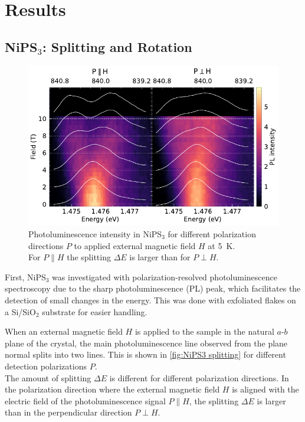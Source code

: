 \documentclass[
	twoside,
	parskip=half,
	a4paper,
]{scrbook}
\begin{document}
\chapter{Results}

\section{NiPS$_3$: Splitting and Rotation}
\begin{figure}
	\centering
	\includegraphics{../figures/2024-04-10 NiPS4 splitting.pdf}
	\caption{
		Photoluminescence intensity in NiPS$_3$ for different polarization directions $P$ to applied external magnetic field $H$ at \SI{5}{K}.\\
		For $P\parallel H$ the splitting $\Delta E$ is larger than for $P\perp H$.
	}
	\label{fig:NiPS3 splitting}
\end{figure}
First, NiPS$_3$ was investigated with polarization-resolved photoluminescence spectroscopy due to the sharp photoluminescence (PL) peak, which facilitates the detection of small changes in the energy.
This was done with exfoliated flakes on a Si/SiO$_2$ substrate for easier handling.

When an external magnetic field $H$ is applied to the sample in the natural $a$-$b$ plane of the crystal, the main photoluminescence line observed from the plane normal splits into two lines.
This is shown in \autoref{fig:NiPS3 splitting} for different detection polarizations $P$.\\
The amount of splitting $\Delta E$ is different for different polarization directions.
In the polarization direction where the external magnetic field $H$ is aligned with the electric field of the photoluminescence signal $P\parallel H$, the splitting $\Delta E$ is larger than in the perpendicular direction $P\perp H$.
\end{document}
